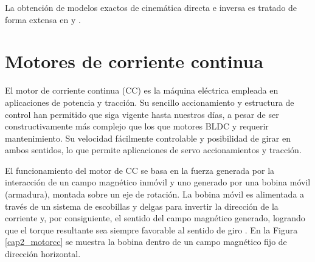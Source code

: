 La obtención de modelos exactos de cinemática directa e inversa es tratado de forma extensa en \cite{cole2007} y \cite{predescu2015}.

\section{Motores de corriente continua}

El motor de corriente continua (CC) es la máquina eléctrica empleada en aplicaciones de potencia y tracción. Su sencillo accionamiento y estructura de control han permitido que siga vigente hasta nuestros días, a pesar de ser constructivamente más complejo que los que motores BLDC y requerir mantenimiento. Su velocidad fácilmente controlable y posibilidad de girar en ambos sentidos, lo  que permite aplicaciones de servo accionamientos y tracción.

El funcionamiento del motor de CC se basa en la fuerza generada por la interacción de un campo magnético inmóvil y uno generado por una bobina móvil (armadura), montada sobre un eje de rotación. La bobina móvil es alimentada a través de un sistema de escobillas y delgas para invertir la dirección de la corriente y, por consiguiente, el sentido del campo magnético generado, logrando que el torque resultante sea siempre favorable al sentido de giro \cite{vargas2006}. En la Figura \ref{cap2_motorcc} se muestra la bobina dentro de un campo magnético fijo de dirección horizontal.

